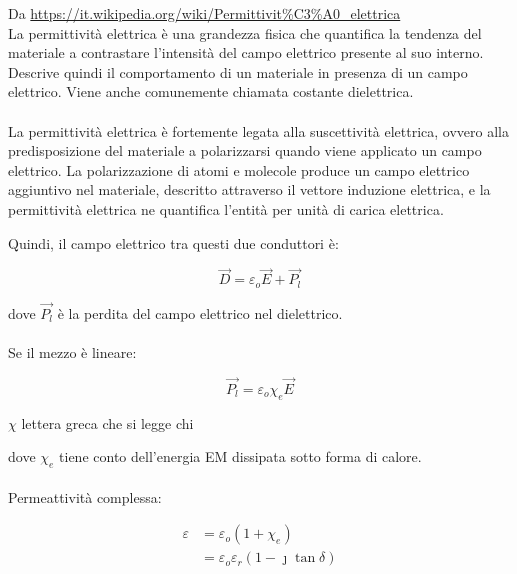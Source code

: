 \begin{tcolorbox}
Da \url{https://it.wikipedia.org/wiki/Permittivit%C3%A0_elettrica} \\
La permittività elettrica è una grandezza fisica che quantifica la tendenza del materiale a contrastare l'intensità del campo elettrico presente al suo interno. Descrive quindi il comportamento di un materiale in presenza di un campo elettrico. Viene anche comunemente chiamata costante dielettrica. \\ \\ 
La permittività elettrica è fortemente legata alla suscettività elettrica, ovvero alla predisposizione del materiale a polarizzarsi quando viene applicato un campo elettrico. La polarizzazione di atomi e molecole produce un campo elettrico aggiuntivo nel materiale, descritto attraverso il vettore induzione elettrica, e la permittività elettrica ne quantifica l'entità per unità di carica elettrica.    
\end{tcolorbox}

Quindi, il campo elettrico tra questi due conduttori è: 

{\Large \begin{equation}
    \vec{D} = \varepsilon_o \vec{E} + \vec{P_l}
\end{equation}}
 
dove $\vec{P_l}$ è la perdita del campo elettrico nel dielettrico. \\ \\ 

Se il mezzo è lineare: 

{\Large \begin{equation}
    \vec{P_l} = \varepsilon_o \chi_e \vec{E}
\end{equation}} 

\begin{tcolorbox}
    $\chi$ lettera greca che si legge chi
\end{tcolorbox}

dove $\chi_e$ tiene conto dell'energia EM dissipata sotto forma di calore. \\ \\ 

Permeattività complessa: 

{\Large \begin{equation}
    \begin{split}
        \varepsilon 
        &= \varepsilon_o (1 + \chi_e) \\ 
        &= \varepsilon_o \varepsilon_r (1 - \jmath \tan \delta)
    \end{split}
\end{equation}}

